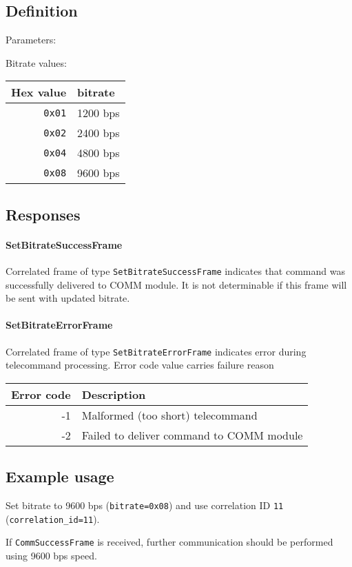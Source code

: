\subsection{Definition}

Parameters: 

\begin{tcarglist}	
\end{tcarglist}

Bitrate values:

\begin{tabular}{r | l}
	Hex value & bitrate \\ \hline
	\texttt{0x01} & 1200 bps \\
	\texttt{0x02} & 2400 bps \\
	\texttt{0x04} & 4800 bps \\
	\texttt{0x08} & 9600 bps
\end{tabular}


\subsection{Responses}

\paragraph{SetBitrateSuccessFrame}

Correlated frame of type \texttt{SetBitrateSuccessFrame} indicates that command was successfully delivered to COMM module. It is not determinable if this frame will be sent with updated bitrate.

\paragraph{SetBitrateErrorFrame}

Correlated frame of type \texttt{SetBitrateErrorFrame} indicates error during telecommand processing. Error code value carries failure reason

\begin{tabular}{r | l}
	Error code & Description \\ \hline
	-1 		& Malformed (too short) telecommand \\
	-2 		& Failed to deliver command to COMM module
\end{tabular}

\subsection{Example usage}
Set bitrate to 9600 bps (\texttt{bitrate=0x08}) and use correlation ID \texttt{11} (\texttt{correlation\_id=11}).


If \texttt{CommSuccessFrame} is received, further communication should be performed using 9600 bps speed.